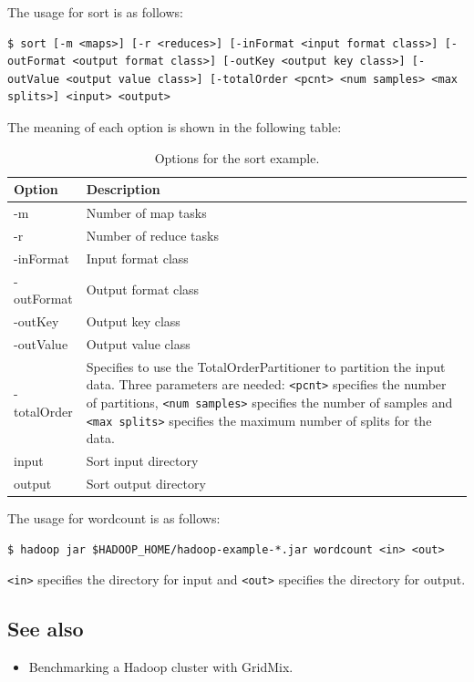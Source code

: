 The usage for sort is as follows: 
\lstset{style=bashstyle}
\begin{lstlisting}
$ sort [-m <maps>] [-r <reduces>] [-inFormat <input format class>] [-outFormat <output format class>] [-outKey <output key class>] [-outValue <output value class>] [-totalOrder <pcnt> <num samples> <max splits>] <input> <output>
\end{lstlisting}

The meaning of each option is shown in the following table:
\begin{table}[ht]
  \centering
  \begin{tabular}{ll}
    \toprule
    \textbf{Option} & \textbf{Description} \\ \midrule
      -m & Number of map tasks \\
      -r & Number of reduce tasks \\
      -inFormat & Input format class \\
      -outFormat & Output format class \\
      -outKey & Output key class \\
      -outValue & Output value class \\
      -totalOrder & \begin{minipage}[t]{0.8\textwidth}Specifies to use the TotalOrderPartitioner to partition the input data. Three parameters are needed: \verb|<pcnt>| specifies the number of partitions, \verb|<num samples>| specifies the number of samples and \verb|<max splits>| specifies the maximum number of splits for the data.\end{minipage} \\
      input & Sort input directory \\
      output & Sort output directory \\ \bottomrule
    \end{tabular}
    \caption{Options for the sort example.}\label{tbl:sort}
  \end{table}

The usage for wordcount is as follows:
\lstset{style=bashstyle}
\begin{lstlisting}
$ hadoop jar $HADOOP_HOME/hadoop-example-*.jar wordcount <in> <out>
\end{lstlisting}
\verb|<in>| specifies the directory for input and \verb|<out>| specifies the directory for output.

\subsection*{See also}
\begin{itemize}
  \item Benchmarking a Hadoop cluster with GridMix.
\end{itemize}
